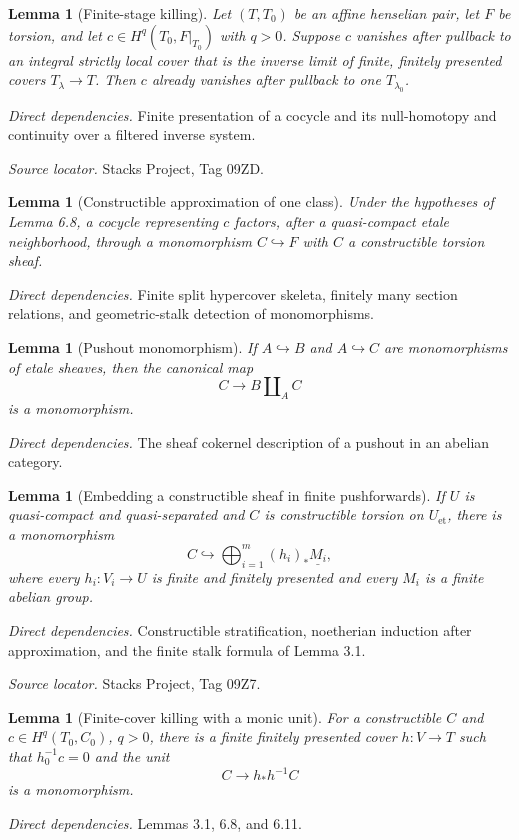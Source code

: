 \documentclass[10pt]{article}
\newtheorem{lemma}[theorem]{Lemma}
\theoremstyle{definition}
\newcommand{\Et}{\mathrm{et}}
\newcommand{\deps}[1]{\par\smallskip\textit{Direct dependencies.} #1\par}
\newcommand{\sources}[1]{\par\textit{Source locator.} #1\par}
\begin{document}
\begin{lemma}[Finite-stage killing]
Let $(T,T_0)$ be an affine henselian pair, let $F$ be torsion, and let
$c\in H^q(T_0,F|_{T_0})$ with $q>0$.  Suppose $c$ vanishes after pullback
to an integral strictly local cover that is the inverse limit of finite,
finitely presented covers $T_\lambda\to T$.  Then $c$ already vanishes
after pullback to one $T_{\lambda_0}$.
\end{lemma}
\deps{Finite presentation of a cocycle and its null-homotopy and
continuity over a filtered inverse system.}
\sources{Stacks Project, Tag 09ZD.}

\begin{lemma}[Constructible approximation of one class]
Under the hypotheses of Lemma 6.8, a cocycle representing $c$ factors,
after a quasi-compact etale neighborhood, through a monomorphism
$C\hookrightarrow F$ with $C$ a constructible torsion sheaf.
\end{lemma}
\deps{Finite split hypercover skeleta, finitely many section relations,
and geometric-stalk detection of monomorphisms.}

\begin{lemma}[Pushout monomorphism]
If $A\hookrightarrow B$ and $A\hookrightarrow C$ are monomorphisms of
etale sheaves, then the canonical map
\[
 C\longrightarrow B\amalg_AC
\]
is a monomorphism.
\end{lemma}
\deps{The sheaf cokernel description of a pushout in an abelian category.}

\begin{lemma}[Embedding a constructible sheaf in finite pushforwards]
If $U$ is quasi-compact and quasi-separated and $C$ is constructible
torsion on $U_{\Et}$, there is a monomorphism
\[
 C\hookrightarrow\bigoplus_{i=1}^m(h_i)_*\underline{M_i},
\]
where every $h_i:V_i\to U$ is finite and finitely presented and every
$M_i$ is a finite abelian group.
\end{lemma}
\deps{Constructible stratification, noetherian induction after
approximation, and the finite stalk formula of Lemma 3.1.}
\sources{Stacks Project, Tag 09Z7.}

\begin{lemma}[Finite-cover killing with a monic unit]
For a constructible $C$ and $c\in H^q(T_0,C_0)$, $q>0$, there is a finite
finitely presented cover $h:V\to T$ such that $h_0^{-1}c=0$ and the unit
\[
 C\longrightarrow h_*h^{-1}C
\]
is a monomorphism.
\end{lemma}
\deps{Lemmas 3.1, 6.8, and 6.11.}
\end{document}
